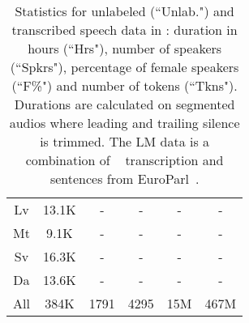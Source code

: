 \begin{table}[t]
\begin{tabular}{c|c|ccc|c}
    Lv & 13.1K & - & - & - & - \\
    Mt & 9.1K & - & - & - & - \\
    Sv & 16.3K & - & - & - & - \\
    Da & 13.6K & - & - & - & - \\
    \midrule
    All & 384K & 1791 & 4295 & 15M & 467M \\
\bottomrule
    \end{tabular}
    \caption{Statistics for unlabeled (``Unlab.") and transcribed speech data in \vp: duration in hours (``Hrs"), number of speakers (``Spkrs"), percentage of female speakers (``F\%") and number of tokens (``Tkns"). Durations are calculated on segmented audios where leading and trailing silence is trimmed. The LM data is a combination of \vp~ transcription and sentences from EuroParl~\citep{koehn2005europarl}.}
    \label{tab:unlabeled_transcribed_stats}
\end{table}


